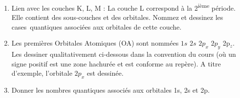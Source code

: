 \begin{enumerate}[\bf 1)]
\item Lien avec les couches K, L, M : La couche L correspond \`a la 2\textsuperscript{i\`eme} p\'eriode. Elle contient des
sous-couches et des orbitales. Nommez et dessinez les cases~quantiques associ\'ees aux orbitales de cette couche.
\item Les premi\`eres Orbitales Atomiques (OA) sont nomm\'ees $1s$ $2s$ $2p_x$ $2p_y$
2p$_z$. Les dessiner qualitativement ci-dessous dans la convention du cours (o\`u un signe positif est une
zone hachur\'ee et est conforme au rep\`ere). A titre d'exemple, l'orbitale $2p_x$ est dessin\'ee.
\item Donner les nombres quantiques associés aux orbitales 1s, 2s et 2p.
\end{enumerate}
%
\begin{center}
\begin{tabular}{ccccc}

\end{tabular}
\end{center}
